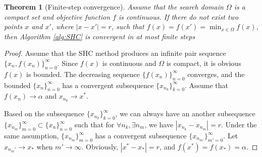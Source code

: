 \documentclass[preprint,12pt]{elsarticle}
\newtheorem{theorem}{Theorem}
\begin{document}
\begin{theorem}[Finite-step convergence]
	Assume that the search domain $\Omega$ is a compact set and 
	objective function $f$ is continuous.
	If there do not exist two points $x$ and $x'$, where
	$|x-x'|=r$, such that
	$f(x)=f(x')=\min_{x\in\Omega}f(x)$, then
	Algorithm \ref{alg:SHC} is convergent in at most finite steps
\end{theorem}
\begin{proof}
	Assume that the SHC method produces an infinite pair sequence
	$\{x_n, f(x_n)\}_{n=0}^{\infty}$.
	Since $f(x)$ is continuous and $\Omega$ is compact, 
	it is obvious $f(x)$ is bounded. The decreasing sequence
	$\{f(x_n)\}_{n=0}^\infty$ converges, and the bounded
	$\{x_n\}_{n=0}^\infty$ has a convergent subsequence 
	$\{x_{n_k}\}_{k=0}^\infty$. Assume that $f(x_n)\rightarrow
	\alpha$ and $x_{n_k}\rightarrow x^*$. 
	
	Based on the subsequence $\{x_{n_k}\}_{k=0}^\infty$, we can
	always have an another subsequence
	$\{x_{n_m}\}_{m=0}^\infty\subset \{x_n\}_{n=0}^{\infty}$ such that 
	for $\forall n_k, \exists n_m$, we have  
	$|x_{n_k}-x_{n_{m}}|=r$. Under the same assumption,
	$\{x_{n_m}\}_{m=0}^\infty$ has a convergent subsequence
	$\{x_{n_{m'}}\}_{m'=0}^\infty$. Let $x_{n_m'} \rightarrow
	x_*$ when $m'\rightarrow \infty$. 
	Obviously, $|x^*-x_*|=r$, and $f(x^*)=f(x_*)=\alpha$.



%    


\end{proof}
\end{document}
